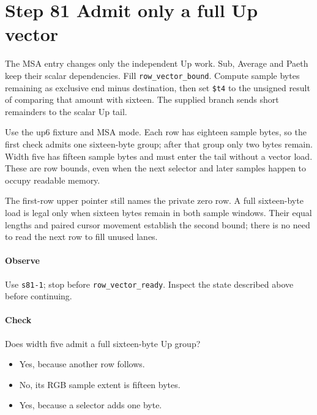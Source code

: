 \section{Step 81 Admit only a full Up vector}
The MSA entry changes only the independent Up work. Sub, Average and Paeth keep their scalar dependencies. Fill \texttt{row\_vector\_bound}. Compute sample bytes remaining as exclusive end minus destination, then set \texttt{\$t4} to the unsigned result of comparing that amount with sixteen. The supplied branch sends short remainders to the scalar Up tail.

Use the up6 fixture and MSA mode. Each row has eighteen sample bytes, so the first check admits one sixteen-byte group; after that group only two bytes remain. Width five has fifteen sample bytes and must enter the tail without a vector load. These are row bounds, even when the next selector and later samples happen to occupy readable memory.

The first-row upper pointer still names the private zero row. A full sixteen-byte load is legal only when sixteen bytes remain in both sample windows. Their equal lengths and paired cursor movement establish the second bound; there is no need to read the next row to fill unused lanes.

\paragraph{Observe} Use \texttt{s81-1}; stop before \texttt{row\_vector\_ready}. Inspect the state described above before continuing.

\paragraph{Check} Does width five admit a full sixteen-byte Up group?
\begin{itemize}
\item[A.] Yes, because another row follows.
\item[B.] No, its RGB sample extent is fifteen bytes.
\item[C.] Yes, because a selector adds one byte.
\end{itemize}
